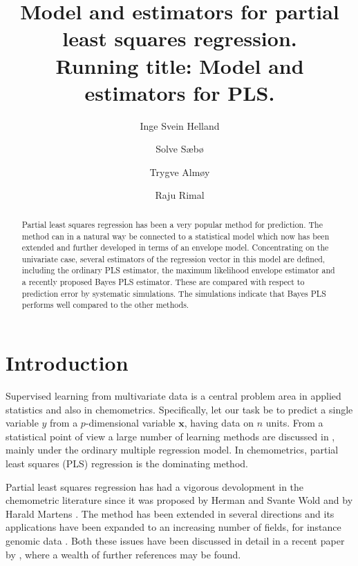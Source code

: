 \documentclass[num-refs]{wiley-article}
\title{Model and estimators for partial least squares regression. \\
  Running title: Model and estimators for PLS.}
\author[1]{Inge Svein Helland}
\author[2]{Solve S\ae b\o}
\author[2]{Trygve Alm\o y}
\author[2]{Raju Rimal}
\affil[1]{University of Oslo}
\affil[2]{Norwegian University of Life Sciences}
\begin{document}
\maketitle

\begin{abstract}
Partial least squares regression has been a very popular method for prediction. The method can in a natural way be connected to a statistical model which now has been extended and further developed in terms of an envelope model. Concentrating on the univariate case, several estimators of the regression vector in this model are defined, including the ordinary PLS estimator, the maximum likelihood envelope estimator and a recently proposed Bayes PLS estimator. These are compared with respect to prediction error by systematic simulations. The simulations indicate that Bayes PLS performs well compared to the other methods.


\end{abstract}

\section{Introduction}

Supervised learning from multivariate data is a central problem area in applied statistics and also in chemometrics. Specifically, let our task be to predict a single variable $y$ from a $p$-dimensional variable $\bm{x}$, having data on $n$ units. From a statistical point of view a large number of learning methods are discussed in \citet{hastie2009elements}, mainly under the ordinary multiple regression model. In chemometrics, partial least squares (PLS) regression is the dominating method.

Partial least squares regression has had a vigorous devolopment in the
chemometric literature since it was proposed by Herman and Svante Wold and by
Harald Martens \citep{wold1983collinearity, martens1989multivariate}. The method
has been extended in several directions and its applications have been expanded
to an increasing number of fields, for instance genomic data
\citep{boulesteix2007partial}. Both these issues have been discussed in detail
in a recent paper by \citeauthor{mehmood2016diversity} \citet{mehmood2016diversity}, where a wealth of further references may be found.
\end{document}
